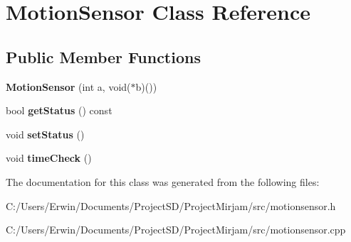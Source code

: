 \hypertarget{class_motion_sensor}{}\section{Motion\+Sensor Class Reference}
\label{class_motion_sensor}
\subsection*{Public Member Functions}
\begin{DoxyCompactItemize}
\item 
\hypertarget{class_motion_sensor_ab6dec78eb453fae1a7784bc53db8c319}{}{\bfseries Motion\+Sensor} (int a, void($\ast$b)())\label{class_motion_sensor_ab6dec78eb453fae1a7784bc53db8c319}

\item 
\hypertarget{class_motion_sensor_afaa71fb8b40e9745472be8ea502d4b7d}{}bool {\bfseries get\+Status} () const \label{class_motion_sensor_afaa71fb8b40e9745472be8ea502d4b7d}

\item 
\hypertarget{class_motion_sensor_a6c5610df99f05c2899489a7dd4e03c46}{}void {\bfseries set\+Status} ()\label{class_motion_sensor_a6c5610df99f05c2899489a7dd4e03c46}

\item 
\hypertarget{class_motion_sensor_a02dfae657132e2d4cedce9dcd63739a0}{}void {\bfseries time\+Check} ()\label{class_motion_sensor_a02dfae657132e2d4cedce9dcd63739a0}

\end{DoxyCompactItemize}


The documentation for this class was generated from the following files\+:\begin{DoxyCompactItemize}
\item 
C\+:/\+Users/\+Erwin/\+Documents/\+Project\+S\+D/\+Project\+Mirjam/src/motionsensor.\+h\item 
C\+:/\+Users/\+Erwin/\+Documents/\+Project\+S\+D/\+Project\+Mirjam/src/motionsensor.\+cpp\end{DoxyCompactItemize}
